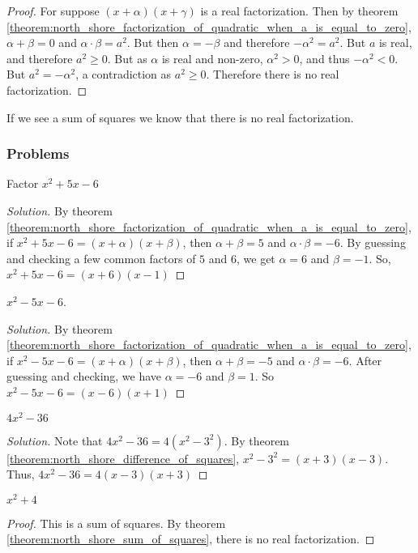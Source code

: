 \documentclass[../main.tex]{subfiles}
\begin{document}
\begin{proof}
For suppose $(x+\alpha)(x+\gamma)$ is a real factorization. Then by theorem \ref{theorem:north_shore_factorization_of_quadratic_when_a_is_equal_to_zero}, $\alpha+\beta = 0$ and $\alpha\cdot \beta = a^2$. But then $\alpha = -\beta$ and therefore $-\alpha^2 = a^2$. But $a$ is real, and therefore $a^2 \geq 0$. But as $\alpha$ is real and non-zero, $\alpha^2> 0$, and thus $-\alpha^2 <0$. But $a^2 = -\alpha^2$, a contradiction as $a^2 \geq 0$. Therefore there is no real factorization.
\end{proof}
%
\begin{remark}
If we see a sum of squares we know that there is no real factorization.
\end{remark}
%
\subsubsection{Problems}
%
\begin{problem}
Factor $x^2 + 5x - 6$
\end{problem}
\begin{proof}[Solution]
By theorem \ref{theorem:north_shore_factorization_of_quadratic_when_a_is_equal_to_zero}, if $x^2+5x-6 = (x+\alpha)(x+\beta)$, then $\alpha+\beta = 5$ and $\alpha\cdot \beta = -6$. By guessing and checking a few common factors of $5$ and $6$, we get $\alpha = 6$ and $\beta = -1$. So, $x^2+5x-6 = (x+6)(x-1)$
\end{proof}
%
\begin{problem}
$x^2 - 5x - 6$.
\end{problem}
\begin{proof}[Solution]
By theorem \ref{theorem:north_shore_factorization_of_quadratic_when_a_is_equal_to_zero}, if $x^2-5x-6=(x+\alpha)(x+\beta)$, then $\alpha+\beta = -5$ and $\alpha\cdot \beta = -6$. After guessing and checking, we have $\alpha = -6$ and $\beta = 1$. So $x^2-5x-6 = (x-6)(x+1)$
\end{proof}
%
\begin{problem}
$4x^2 - 36$
\end{problem}
\begin{proof}[Solution]
Note that $4x^2-36 = 4(x^2-3^2)$. By theorem \ref{theorem:north_shore_difference_of_squares}, $x^2-3^2= (x+3)(x-3)$. Thus, $4x^2-36 = 4(x-3)(x+3)$
\end{proof}
%
\begin{problem}
$x^2 + 4$
\end{problem}
\begin{proof}
This is a sum of squares. By theorem \ref{theorem:north_shore_sum_of_squares}, there is no real factorization.
\end{proof}
\end{document}
